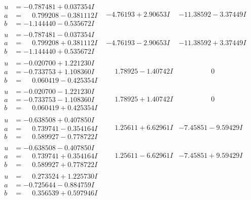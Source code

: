 \documentclass[1p]{elsarticle_modified}
\theoremstyle{definition}
\begin{document}
$$\begin{array}{c|c|c}
\begin{aligned}
u &= -0.787481 + 0.037354 I \\
a &= \phantom{-}0.799208 - 0.381112 I \\
b &= -1.144440 - 0.535672 I\end{aligned}
 & -4.76193 + 2.90653 I & -11.38592 - 3.37449 I \\ \hline\begin{aligned}
u &= -0.787481 - 0.037354 I \\
a &= \phantom{-}0.799208 + 0.381112 I \\
b &= -1.144440 + 0.535672 I\end{aligned}
 & -4.76193 - 2.90653 I & -11.38592 + 3.37449 I \\ \hline\begin{aligned}
u &= -0.020700 + 1.221230 I \\
a &= -0.733753 + 1.108360 I \\
b &= \phantom{-}0.060419 - 0.425354 I\end{aligned}
 & \phantom{-}1.78925 - 1.40742 I & \phantom{-0.000000 } 0 \\ \hline\begin{aligned}
u &= -0.020700 - 1.221230 I \\
a &= -0.733753 - 1.108360 I \\
b &= \phantom{-}0.060419 + 0.425354 I\end{aligned}
 & \phantom{-}1.78925 + 1.40742 I & \phantom{-0.000000 } 0 \\ \hline\begin{aligned}
u &= -0.638508 + 0.407850 I \\
a &= \phantom{-}0.739741 - 0.354164 I \\
b &= \phantom{-}0.589927 - 0.778722 I\end{aligned}
 & \phantom{-}1.25611 + 6.62961 I & -7.45851 - 9.59429 I \\ \hline\begin{aligned}
u &= -0.638508 - 0.407850 I \\
a &= \phantom{-}0.739741 + 0.354164 I \\
b &= \phantom{-}0.589927 + 0.778722 I\end{aligned}
 & \phantom{-}1.25611 - 6.62961 I & -7.45851 + 9.59429 I \\ \hline\begin{aligned}
u &= \phantom{-}0.273524 + 1.225730 I \\
a &= -0.725644 - 0.884759 I \\
b &= \phantom{-}0.356539 + 0.597946 I\end{aligned}

\end{array}$$
\end{document}
